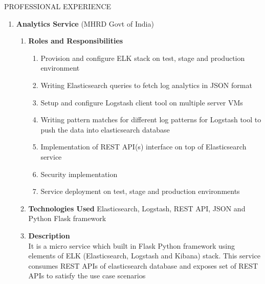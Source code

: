 \documentclass{resume} %
\newcommand{\blank}[1]{\hspace*{#1}}
\begin{document}
\begin{rSection}{PROFESSIONAL EXPERIENCE}
\begin{rSubsection}
\begin{enumerate}[label=\bfseries\arabic*]
\item \textbf{Analytics Service} (MHRD Govt of India)
  \begin{enumerate}
  \item \textbf{Roles and Responsibilities }
    \begin{enumerate}
    \item Provision and configure ELK stack on test, stage and
      production environment
    \item Writing Elasticsearch queries to fetch log analytics in JSON
      format
    \item Setup and configure Logstash client tool on multiple server
      VMs
    \item Writing pattern matches for different log patterns for
      Logstash tool to push the data into elasticsearch database
    \item Implementation of REST API(s) interface on top of
      Elasticsearch service
    \item Security implementation
    \item Service deployment on test, stage and production environments
    \end{enumerate}
  \item \textbf{Technologies Used } Elasticsearch, Logstash, REST API,
    JSON and Python Flask framework
  \item \textbf{Description } \\ \blank{2 cm} It is a micro
    service which built in Flask Python framework using
    elements of ELK (Elasticsearch, Logstash and Kibana)
    stack. This service consumes REST APIs of elasticsearch
    database and exposes set of REST APIs to satisfy the use
    case scenarios
  \end{enumerate}


\end{enumerate}
\end{rSubsection}
\end{rSection}
\end{document}
